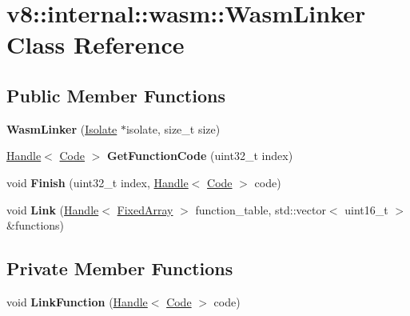 \hypertarget{classv8_1_1internal_1_1wasm_1_1_wasm_linker}{}\section{v8\+:\+:internal\+:\+:wasm\+:\+:Wasm\+Linker Class Reference}
\label{classv8_1_1internal_1_1wasm_1_1_wasm_linker}
\subsection*{Public Member Functions}
\begin{DoxyCompactItemize}
\item 
{\bfseries Wasm\+Linker} (\hyperlink{classv8_1_1internal_1_1_isolate}{Isolate} $\ast$isolate, size\+\_\+t size)\hypertarget{classv8_1_1internal_1_1wasm_1_1_wasm_linker_aa1a4b41e69a90168043c63a36060ba8f}{}\label{classv8_1_1internal_1_1wasm_1_1_wasm_linker_aa1a4b41e69a90168043c63a36060ba8f}

\item 
\hyperlink{classv8_1_1internal_1_1_handle}{Handle}$<$ \hyperlink{classv8_1_1internal_1_1_code}{Code} $>$ {\bfseries Get\+Function\+Code} (uint32\+\_\+t index)\hypertarget{classv8_1_1internal_1_1wasm_1_1_wasm_linker_a9206c261937ea4248e10ddc91dd6071b}{}\label{classv8_1_1internal_1_1wasm_1_1_wasm_linker_a9206c261937ea4248e10ddc91dd6071b}

\item 
void {\bfseries Finish} (uint32\+\_\+t index, \hyperlink{classv8_1_1internal_1_1_handle}{Handle}$<$ \hyperlink{classv8_1_1internal_1_1_code}{Code} $>$ code)\hypertarget{classv8_1_1internal_1_1wasm_1_1_wasm_linker_a64ad01cf751a0ac13014d19a6682e022}{}\label{classv8_1_1internal_1_1wasm_1_1_wasm_linker_a64ad01cf751a0ac13014d19a6682e022}

\item 
void {\bfseries Link} (\hyperlink{classv8_1_1internal_1_1_handle}{Handle}$<$ \hyperlink{classv8_1_1internal_1_1_fixed_array}{Fixed\+Array} $>$ function\+\_\+table, std\+::vector$<$ uint16\+\_\+t $>$ \&functions)\hypertarget{classv8_1_1internal_1_1wasm_1_1_wasm_linker_aae9542ff180053dc64d8d1eecb4eac00}{}\label{classv8_1_1internal_1_1wasm_1_1_wasm_linker_aae9542ff180053dc64d8d1eecb4eac00}

\end{DoxyCompactItemize}
\subsection*{Private Member Functions}
\begin{DoxyCompactItemize}
\item 
void {\bfseries Link\+Function} (\hyperlink{classv8_1_1internal_1_1_handle}{Handle}$<$ \hyperlink{classv8_1_1internal_1_1_code}{Code} $>$ code)\hypertarget{classv8_1_1internal_1_1wasm_1_1_wasm_linker_adccd4d7402272c1ecc26aa3d766ea066}{}\label{classv8_1_1internal_1_1wasm_1_1_wasm_linker_adccd4d7402272c1ecc26aa3d766ea066}

\end{DoxyCompactItemize}
